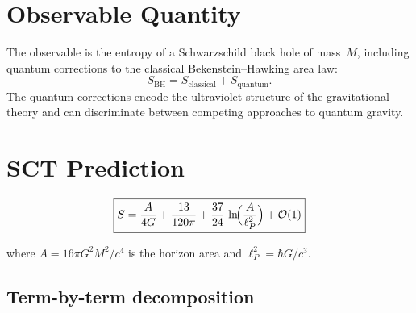 \documentclass[11pt,a4paper]{article}
\begin{document}
\section{Observable Quantity}

The observable is the entropy of a Schwarzschild black hole of mass~$M$,
including quantum corrections to the classical Bekenstein--Hawking area law:
\[
  S_{\mathrm{BH}} = S_{\mathrm{classical}} + S_{\mathrm{quantum}}.
\]
The quantum corrections encode the ultraviolet structure of the gravitational
theory and can discriminate between competing approaches to quantum gravity.

\section{SCT Prediction}

\begin{equation}
\boxed{
  S = \frac{A}{4G}
  + \frac{13}{120\pi}
  + \frac{37}{24}\,\ln\!\Bigl(\frac{A}{\ell_P^2}\Bigr)
  + \mathcal{O}(1)
}
\label{eq:main}
\end{equation}

where $A = 16\pi G^2 M^2/c^4$ is the horizon area and $\ell_P^2 = \hbar G/c^3$.

\subsection{Term-by-term decomposition}
\end{document}
